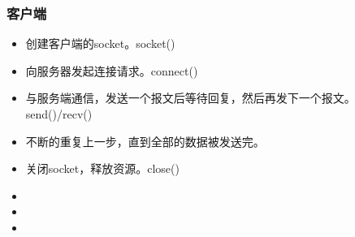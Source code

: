 \documentclass[UTF8]{article}%
\begin{document}
\subsubsection{客户端}

\begin{itemize}
    \item 创建客户端的socket。socket()
    \item 向服务器发起连接请求。connect()
    \item 与服务端通信，发送一个报文后等待回复，然后再发下一个报文。send()/recv()
    \item 不断的重复上一步，直到全部的数据被发送完。
    \item 关闭socket，释放资源。close()
\end{itemize}









\begin{itemize}
    \item 
    \item 
    \item 
\end{itemize}
\end{document}
